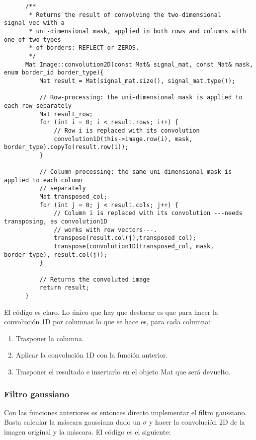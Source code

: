 \documentclass[a4paper, 11pt]{article}
\theoremstyle{definition}
\theoremstyle{theorem}
\begin{document}
  \begin{lstlisting}
      /**
       * Returns the result of convolving the two-dimensional signal_vec with a
       * uni-dimensional mask, applied in both rows and columns with one of two types
       * of borders: REFLECT or ZEROS.
       */
      Mat Image::convolution2D(const Mat& signal_mat, const Mat& mask, enum border_id border_type){
          Mat result = Mat(signal_mat.size(), signal_mat.type());

          // Row-processing: the uni-dimensional mask is applied to each row separately
          Mat result_row;
          for (int i = 0; i < result.rows; i++) {
              // Row i is replaced with its convolution
              convolution1D(this->image.row(i), mask, border_type).copyTo(result.row(i));
          }

          // Column-processing: the same uni-dimensional mask is applied to each column
          // separately
          Mat transposed_col;
          for (int j = 0; j < result.cols; j++) {
              // Column i is replaced with its convolution ---needs transposing, as convolution1D
              // works with row vectors---.
              transpose(result.col(j),transposed_col);
              transpose(convolution1D(transposed_col, mask, border_type), result.col(j));
          }

          // Returns the convoluted image
          return result;
      }
  \end{lstlisting}

  El código es claro. Lo único que hay que destacar es que para hacer la convolución 1D por columnas lo que se hace es, para cada columna:
  \begin{enumerate}
      \item Trasponer la columna.
      \item Aplicar la convolución 1D con la función anterior.
      \item Trasponer el resultado e insertarlo en el objeto Mat que será devuelto.
  \end{enumerate}

  \subsubsection*{Filtro gaussiano}
  Con las funciones anteriores es entonces directo implementar el filtro gaussiano. Basta calcular la máscara gaussiana dado un $\sigma$ y hacer la convolución 2D de la imagen original y la máscara. El código es el siguiente:
\end{document}
